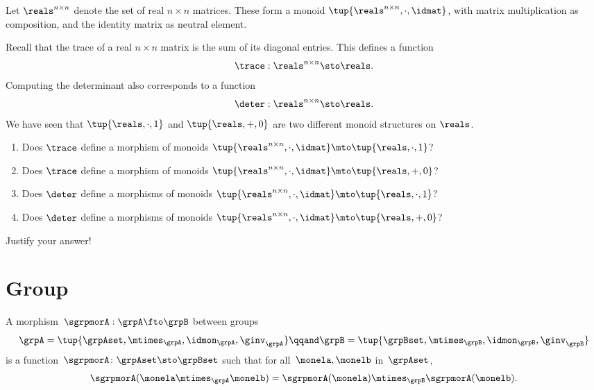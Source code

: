 \begin{gradedexercise}
  \label{ex:tr-and-det}
Let $ \reals^{n \times n}$ denote the set of real $n \times n$ matrices. These form a monoid $\tup{\reals^{n \times n}, \cdot, \idmat}$, with matrix multiplication as composition, and the identity matrix as neutral element.

Recall that the trace of a real $n \times n$ matrix is the sum of its diagonal entries. This defines a function
\begin{equation}
\trace : \reals^{n \times n} \sto \reals.
\end{equation}
Computing the determinant also corresponds to a function
\begin{equation}
\deter : \reals^{n \times n} \sto \reals.
\end{equation}
We have seen that $\tup{ \reals, \cdot, 1}$ and $\tup{ \reals, +, 0}$ are two different monoid structures on $\reals$.
\begin{enumerate}
\item Does $\trace$ define a morphism of monoids
$\tup{\reals^{n \times n}, \cdot, \idmat} \mto \tup{ \reals, \cdot, 1}$?
\item Does $\trace$ define a morphism of monoids
$\tup{\reals^{n \times n}, \cdot, \idmat} \mto \tup{ \reals, + , 0}$?
\item Does $\deter$ define a morphisms of monoids $\tup{\reals^{n \times n}, \cdot, \idmat} \mto \tup{ \reals, \cdot, 1}$?
\item Does $\deter$ define a morphisms of monoids $\tup{\reals^{n \times n}, \cdot, \idmat} \mto \tup{ \reals, + , 0}$?
\end{enumerate}
Justify your answer!
\end{gradedexercise}


\section{Group \whomos}





\begin{ctdefinition}
  \label{def:group-mor}
  A morphism~$\sgrpmorA: \grpA \fto \grpB$ between groups
  \begin{equation}
    \grpA = \tup{\grpAset, \mtimes_\grpA, \idmon_\grpA, \ginv_\grpA}
    \qqand
    \grpB = \tup{\grpBset, \mtimes_\grpB, \idmon_\grpB,  \ginv_\grpB}
  \end{equation}
  is a function~$\sgrpmorA \colon \grpAset \sto \grpBset$ such that
  for all~$\monela, \monelb$ in~$\grpAset$,
  \begin{equation}
    \label{eq:group-mor-comp}
    \sgrpmorA (\monela \mtimes_{\grpA} \monelb) = \sgrpmorA (\monela) \mtimes_{\grpB}  \sgrpmorA(\monelb).
  \end{equation}
\end{ctdefinition}

